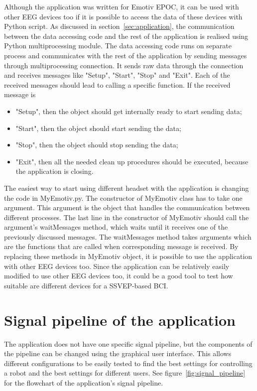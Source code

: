 Although the application was written for Emotiv EPOC, it can be used with other \gls{EEG} devices too if it is possible to access the data of these devices with Python script. As discussed in section~\ref{sec:application}, the communication between the data accessing code and the rest of the application is realised using Python multiprocessing module. The data accessing code runs on separate process and communicates with the rest of the application by sending messages through multiprocessing connection. It sends raw data through the connection and receives messages like "Setup", "Start", "Stop" and "Exit". Each of the received messages should lead to calling a specific function. If the received message is
\begin{itemize}
	\item "Setup", then the object should get internally ready to start sending data;
	\item "Start", then the object should start sending the data;
	\item "Stop", then the object should stop sending the data;
	\item "Exit", then all the needed clean up procedures should be executed, because the application is closing.
\end{itemize}

The easiest way to start using different headset with the application is changing the code in MyEmotiv.py. The constructor of MyEmotiv class has to take one argument. This argument is the object that handles the communication between different processes. The last line in the constructor of MyEmotiv should call the argument's waitMessages method, which waits until it receives one of the previously discussed messages. The waitMessages method takes arguments which are the functions that are called when corresponding message is received. By replacing these methods in MyEmotiv object, it is possible to use the application with other \gls{EEG} devices too. Since the application can be relatively easily modified to use other \gls{EEG} devices too, it could be a good tool to test how suitable are different devices for a \gls{SSVEP}-based \gls{BCI}.

\section{Signal pipeline of the application}
\label{sec:signal_pipeline}

The application does not have one specific signal pipeline, but the components of the pipeline can be changed using the graphical user interface. This allows different configurations to be easily tested to find the best settings for controlling a robot and the best settings for different users. See figure~\ref{fig:signal_pipeline} for the flowchart of the application's signal pipeline.

